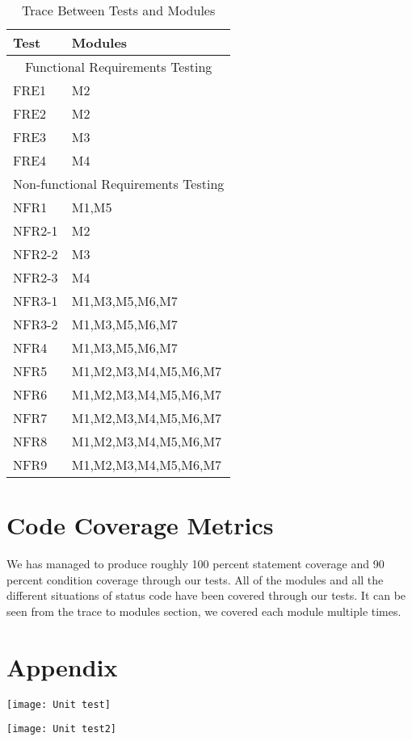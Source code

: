 \documentclass[12pt, titlepage]{article}
\begin{document}
\begin{table}[!htbp]
	\begin{tabular}{ll}
		\toprule
		Test & Modules \\
		\midrule
		\multicolumn{2}{c}{Functional Requirements Testing} \\
		\midrule
		FRE1 & M2 \\
		FRE2 & M2 \\
		FRE3 & M3 \\
		FRE4 & M4 \\
		\midrule
		\multicolumn{2}{c}{Non-functional Requirements Testing} \\
		\midrule
		NFR1 & M1,M5 \\
		NFR2-1 & M2\\
		NFR2-2 & M3\\
		NFR2-3 & M4\\
		NFR3-1 & M1,M3,M5,M6,M7 \\
		NFR3-2 & M1,M3,M5,M6,M7 \\
		NFR4 & M1,M3,M5,M6,M7 \\
		NFR5 & M1,M2,M3,M4,M5,M6,M7 \\
		NFR6 & M1,M2,M3,M4,M5,M6,M7\\
		NFR7 & M1,M2,M3,M4,M5,M6,M7 \\
		NFR8 & M1,M2,M3,M4,M5,M6,M7\\
		NFR9 & M1,M2,M3,M4,M5,M6,M7\\
		\bottomrule
	\end{tabular}
	\caption{Trace Between Tests and Modules}
	\makeatletter
	\def\rulecolor#1#{\CT@arc{#1}}
	\def\CT@arc#1#2{%
		\ifdim\baselineskip=\z@\noalign\fi
		{\gdef\CT@arc@{\color#1{#2}}}}
	\let\CT@arc@\relax
	\makeatother
	\label{Table}
\end{table}
\FloatBarrier

\section{Code Coverage Metrics}

We has managed to produce roughly 100 percent statement coverage and 90 percent condition coverage through our tests. All of the modules and all the different situations of status code have been covered through our tests. It can be seen from the trace to modules section, we covered each module multiple times.

\section{Appendix}

\texttt{[image: Unit test]}


\texttt{[image: Unit test2]}





\end{document}
